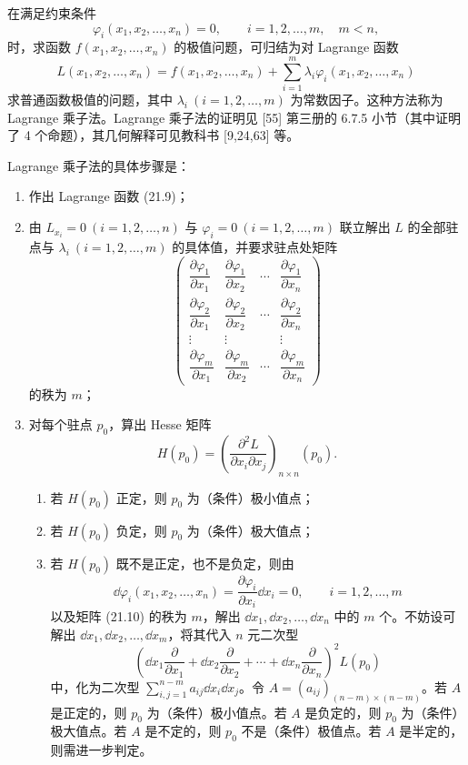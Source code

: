 在满足约束条件
\[
  \varphi_i(x_1,x_2,\ldots,x_n)=0,
  \qquad i=1,2,\ldots,m,\quad m<n,
\]
时，求函数 $f(x_1,x_2,\ldots,x_n)$ 的极值问题，可归结为对 Lagrange 函数
\begin{equation}
  L(x_1,x_2,\ldots,x_n)=f(x_1,x_2,\ldots,x_n)
  +\sum_{i=1}^m\lambda_i\varphi_i(x_1,x_2,\ldots,x_n)
  \tag{21.9}
  \label{eq:21.9}
\end{equation}
求普通函数极值的问题，其中 $\lambda_i\ (i=1,2,\ldots,m)$ 为常数因子。这种方法称为 Lagrange 乘子法。Lagrange 乘子法的证明见 [55] 第三册的 6.7.5 小节（其中证明了 4 个命题），其几何解释可见教科书 [9,24,63] 等。

Lagrange 乘子法的具体步骤是：
\begin{enumerate}[label=\arabic*.]
  \item 作出 Lagrange 函数 (21.9)；
  \item 由 $L_{x_i}=0\ (i=1,2,\ldots,n)$ 与 $\varphi_i=0\ (i=1,2,\ldots,m)$ 联立解出 $L$ 的全部驻点与 $\lambda_i\ (i=1,2,\ldots,m)$ 的具体值，并要求驻点处矩阵
  \begin{equation}
  \begin{pmatrix}
  \dfrac{\partial\varphi_1}{\partial x_1}&\dfrac{\partial\varphi_1}{\partial x_2}&\cdots&\dfrac{\partial\varphi_1}{\partial x_n}\\[4pt]
  \dfrac{\partial\varphi_2}{\partial x_1}&\dfrac{\partial\varphi_2}{\partial x_2}&\cdots&\dfrac{\partial\varphi_2}{\partial x_n}\\
  \vdots&\vdots&&\vdots\\[2pt]
  \dfrac{\partial\varphi_m}{\partial x_1}&\dfrac{\partial\varphi_m}{\partial x_2}&\cdots&\dfrac{\partial\varphi_m}{\partial x_n}
  \end{pmatrix}
  \tag{21.10}
  \label{eq:21.10}
  \end{equation}
  的秩为 $m$；
  \item 对每个驻点 $p_0$，算出 Hesse 矩阵
  \[
    H(p_0)=\left(\frac{\partial^2L}{\partial x_i\partial x_j}\right)_{n\times n}(p_0).
  \]
  \begin{enumerate}[label=(\arabic*)]
    \item 若 $H(p_0)$ 正定，则 $p_0$ 为（条件）极小值点；
    \item 若 $H(p_0)$ 负定，则 $p_0$ 为（条件）极大值点；
    \item 若 $H(p_0)$ 既不是正定，也不是负定，则由
    \[
      \dd\varphi_i(x_1,x_2,\ldots,x_n)=\frac{\partial\varphi_i}{\partial x_i}\dd x_i=0,
      \qquad i=1,2,\ldots,m
    \]
    以及矩阵 (21.10) 的秩为 $m$，解出 $\dd x_1,\dd x_2,\ldots,\dd x_n$ 中的 $m$ 个。不妨设可解出 $\dd x_1,\dd x_2,\ldots,\dd x_m$，将其代入 $n$ 元二次型
    \[
      \left(\dd x_1\frac{\partial}{\partial x_1}+\dd x_2\frac{\partial}{\partial x_2}+\cdots+\dd x_n\frac{\partial}{\partial x_n}\right)^2L(p_0)
    \]
    中，化为二次型 $\sum_{i,j=1}^{n-m}a_{ij}\dd x_i\dd x_j$。令 $A=(a_{ij})_{(n-m)\times(n-m)}$。若 $A$ 是正定的，则 $p_0$ 为（条件）极小值点。若 $A$ 是负定的，则 $p_0$ 为（条件）极大值点。若 $A$ 是不定的，则 $p_0$ 不是（条件）极值点。若 $A$ 是半定的，则需进一步判定。
  \end{enumerate}
\end{enumerate}

